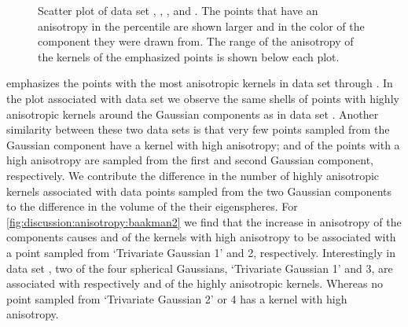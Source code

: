 \begin{figure}
\begin{subfigure}{0.23\textwidth}
				\caption{}
				\label{fig:discussion:anisotropy:baakman3}
			\end{subfigure}			
			\caption{Scatter plot of data set
				 \ferdosiTwo, %
				 \baakmanTwo, %
				 \ferdosiThree, and %
				 \baakmanThree. %
				The points that have an anisotropy in the  percentile are shown larger and in the color of the component they were drawn from. The range of the anisotropy of the kernels of the emphasized points is shown below each plot.}
			\label{fig:discussion:anisotropy:multisphere}
		\end{figure}			
		 emphasizes the points with the most anisotropic kernels in data set \ferdosiTwo through \baakmanThree. 
			In the plot associated with data set \ferdosiTwo we observe the same shells of points with highly anisotropic kernels around the Gaussian components as in data set \ferdosiOne. Another similarity between these two data sets is that very few points sampled from the Gaussian component have a kernel with high anisotropy;  and  of the points with a high anisotropy are sampled from the first and second Gaussian component, respectively. 
			We contribute the difference in the number of highly anisotropic kernels associated with data points sampled from the two Gaussian components to the difference in the volume of the their eigenspheres.
			For \cref{fig:discussion:anisotropy:baakman2} we find that the increase in anisotropy of the components causes  and  of the kernels with high anisotropy to be associated with a point sampled from `Trivariate Gaussian 1' and 2, respectively. 
			Interestingly in data set \ferdosiThree, two of the four spherical Gaussians, `Trivariate Gaussian 1' and 3, are associated with respectively  and  of the highly anisotropic kernels. Whereas no point sampled from `Trivariate Gaussian 2' or 4 has a kernel with high anisotropy.
